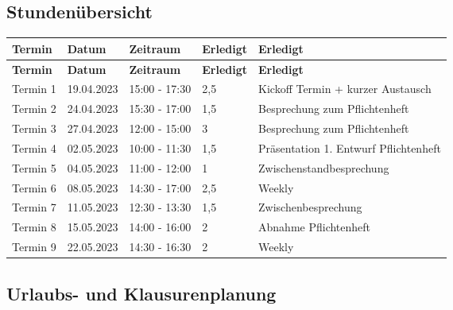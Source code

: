 \subsection{Stundenübersicht}

\begin{flushleft}
		\begin{longtable}{p{2cm}p{2cm}p{3cm}p{2cm}p{8cm}}
            \toprule
            \textbf{Termin} & \textbf{Datum} & \textbf{Zeitraum} & \textbf{Erledigt} & \textbf{Erledigt}\\
            \midrule\endfirsthead
            \toprule
            \textbf{Termin} & \textbf{Datum} & \textbf{Zeitraum} & \textbf{Erledigt} & \textbf{Erledigt}\\
            \midrule\endhead
            	Termin 1 & 19.04.2023 & 15:00 - 17:30 & 2,5 & Kickoff Termin + kurzer Austausch \\ \midrule
				Termin 2 & 24.04.2023 & 15:30 - 17:00 & 1,5 & Besprechung zum Pflichtenheft \\ \midrule
				Termin 3 & 27.04.2023 & 12:00 - 15:00 & 3 & Besprechung zum Pflichtenheft \\ \midrule
				Termin 4 & 02.05.2023 & 10:00 - 11:30 & 1,5 & Präsentation 1. Entwurf Pflichtenheft \\ \midrule
				Termin 5 & 04.05.2023 & 11:00 - 12:00 & 1 & Zwischenstandbesprechung \\ \midrule
				Termin 6 & 08.05.2023 & 14:30 - 17:00 & 2,5 & Weekly\\ \midrule
				Termin 7 & 11.05.2023 & 12:30 - 13:30 & 1,5 & Zwischenbesprechung\\  \midrule
				Termin 8 & 15.05.2023 & 14:00 - 16:00 & 2 & Abnahme Pflichtenheft\\  \midrule
				Termin 9 & 22.05.2023 & 14:30 - 16:30 & 2 & Weekly\\
            \bottomrule
    \end{longtable}
\end{flushleft}

\subsection{Urlaubs- und Klausurenplanung}


